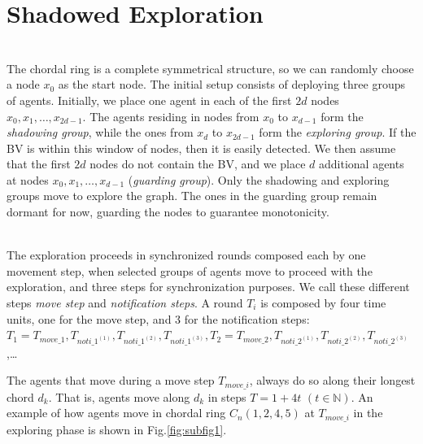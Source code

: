 \section{Shadowed Exploration}
\\
The chordal ring is a complete symmetrical structure, so we can randomly choose a node $x_0$ as the start node.  The initial setup consists of deploying three groups of agents.
Initially, we place one  agent in each of the first $2d$ nodes   $x_0, x_1, \ldots , x_{2d-1}$. 
The agents residing in nodes from $x_0$ to $x_{d-1}$ form the  {\em shadowing group}, while the ones from $x_d$ to $x_{2d-1}$ form the {\em exploring group}. 
If the BV is within this window of nodes, then it is easily detected. We then assume that the  first $2d$ nodes do not contain the BV, and we place $d$ additional agents at nodes $x_ 0,x_1, \ldots, x_{d-1}$ ({\em guarding group}). 
Only the shadowing and exploring groups move to explore the graph. The ones in the guarding group remain dormant for now, guarding the nodes to guarantee monotonicity. 

\\
The exploration proceeds in synchronized rounds composed each by  one movement step, when selected groups of agents move to proceed with the exploration, and three steps for synchronization purposes. We call these different steps {\em move step}  and  {\em notification steps}. A round $T_i$ is composed by four time units, one for the move step, and 3 for the notification steps:$T_1 = T_{move\_1},T_{noti\_1^{(1)}},T_{noti\_1^{(2)}},T_{noti\_1^{(3)}},  T_2 = T_{move\_2},T_{noti\_2^{(1)}},T_{noti\_2^{(2)}},T_{noti\_2^{(3)}}$,\ldots

% 
%
%
The agents that move during a move step $T_{move\_i}$, always do so along their longest chord $d_k$. That is, agents move along $d_k$ in steps $T=1+4t$ $(t\in \mathbb{N})$.  
An example of how agents move in chordal ring $C_n(1, 2 , 4, 5)$ at $T_{move\_i}$ in the  exploring phase is shown in Fig.\ref{fig:subfig1}. \\


